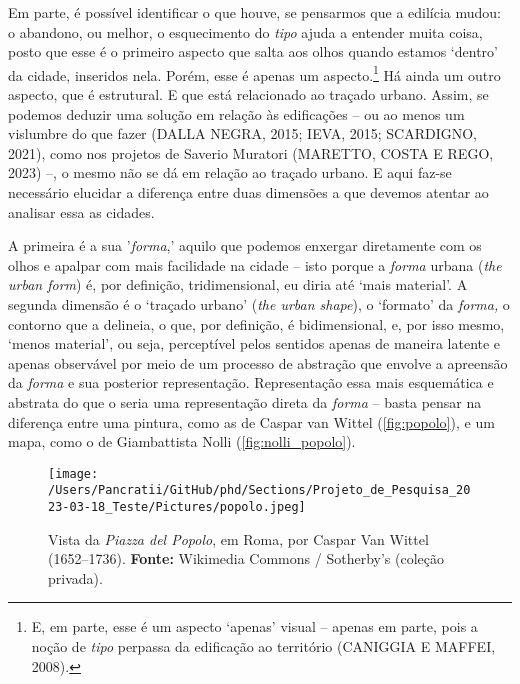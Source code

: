 \documentclass[12pt, a4paper]{book} %
\begin{document}
            Em parte, é possível identificar o que houve, se pensarmos que a edilícia mudou: o abandono, ou melhor, o esquecimento do \textit{tipo} ajuda a entender muita coisa, posto que esse é o primeiro aspecto que salta aos olhos quando estamos `dentro' da cidade, inseridos nela. Porém, esse é apenas um aspecto.\footnote[5]{E, em parte, esse é um aspecto `apenas' visual – apenas em parte, pois a noção de \textit{tipo} perpassa da edificação ao território (CANIGGIA E MAFFEI, 2008). } Há ainda um outro aspecto, que é estrutural. E que está relacionado ao traçado urbano. Assim, se podemos deduzir uma solução em relação às edificações – ou ao menos um vislumbre do que fazer (DALLA NEGRA, 2015; IEVA, 2015; SCARDIGNO, 2021), como nos projetos de Saverio Muratori (MARETTO, COSTA E REGO, 2023) –, o mesmo não se dá em relação ao traçado urbano. E aqui faz-se necessário elucidar a diferença entre duas dimensões a que devemos atentar ao analisar essa as cidades. 
	
	        A primeira é a sua '\textit{forma},' aquilo que podemos enxergar diretamente com os olhos e apalpar com mais facilidade na cidade – isto porque a \textit{forma} urbana (\textit{the urban form}) é, por definição, tridimensional, eu diria até `mais material'. A segunda dimensão é o `traçado urbano' (\textit{the urban shape}), o `formato' da \textit{forma,} o contorno que a delineia, o que, por definição, é bidimensional, e, por isso mesmo, `menos material', ou seja, perceptível pelos sentidos apenas de maneira latente e apenas observável por meio de um processo de abstração que envolve a apreensão da \textit{forma} e sua posterior representação. Representação essa mais esquemática e abstrata do que o seria uma representação direta da \textit{forma} – basta pensar na diferença entre uma pintura, como as de Caspar van Wittel (\autoref{fig:popolo}), e um mapa, como o de Giambattista Nolli (\autoref{fig:nolli_popolo}).

            \begin{figure}[h]
	            \centering
	            \texttt{[image: /Users/Pancratii/GitHub/phd/Sections/Projeto\_de\_Pesquisa\_2023-03-18\_Teste/Pictures/popolo.jpeg]} 
	            \captionsetup{labelfont=bf}
	            \caption{Vista da \textit{Piazza del Popolo}, em Roma, por Caspar Van Wittel (1652–1736). \textbf{Fonte:} Wikimedia Commons / Sotherby's (coleção privada).}
	            \label{fig:popolo}
            \end{figure}   
\end{document}
